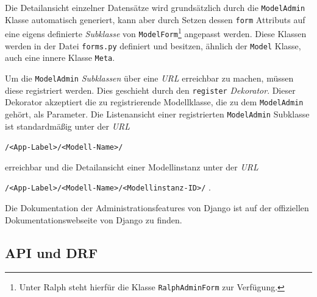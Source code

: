 Die Detailansicht einzelner Datensätze wird grundsätzlich durch die
\texttt{ModelAdmin} Klasse automatisch generiert, kann aber durch Setzen
dessen \texttt{form} Attributs auf eine eigens definierte
\emph{Subklasse}
von \texttt{ModelForm}\footnote{Unter Ralph steht hierfür die Klasse
  \texttt{RalphAdminForm} zur Verfügung.} angepasst werden. Diese
Klassen werden in der Datei \texttt{forms.py} definiert und besitzen,
ähnlich der \texttt{Model} Klasse, auch eine innere Klasse
\texttt{Meta}.

Um die \texttt{ModelAdmin}
\emph{Subklassen}
über eine \emph{URL} 
erreichbar zu machen, müssen diese registriert werden. Dies geschieht
durch den \texttt{register}
\emph{Dekorator}.
Dieser Dekorator akzeptiert die zu registrierende Modellklasse, die zu
dem \texttt{ModelAdmin} gehört, als Parameter. Die Listenansicht einer
registrierten \texttt{ModelAdmin} Subklasse ist standardmäßig unter der
\emph{URL} 

\texttt{/\textless{}App-Label\textgreater{}/\textless{}Modell-Name\textgreater{}/}

erreichbar und die Detailansicht einer Modellinstanz unter der
\emph{URL} 

\texttt{/\textless{}App-Label\textgreater{}/\textless{}Modell-Name\textgreater{}/\textless{}Modellinstanz-ID\textgreater{}/}
.

Die Dokumentation der Administrationsfeatures von Django ist auf der
offiziellen Dokumentationswebseite von Django \cite{django-doku-admin}
zu finden.

\hypertarget{api-und-drf}{%
\subsection{API und DRF}\label{api-und-drf}}

